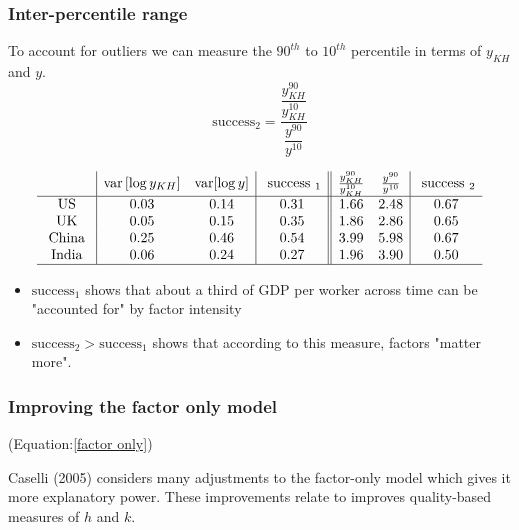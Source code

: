 \documentclass[11pt]{article}
\begin{document}
\subsubsection{Inter-percentile range}

To account for outliers we can measure the $90^{th}$ to $10^{th}$ percentile in terms of $y_{KH}$ and $y$.
\begin{equation}
    \label{success2}
    \text{success}_2 = \dfrac{\dfrac{y_{KH}^{90}}{y_{KH}^{10}}}{\dfrac{y^{90}}{y^{10}}}
\end{equation}

\begin{equation}
\begin{array}{c|cc|c||cc|c} 
& \operatorname{var}\left[\log y_{K H}\right] & \operatorname{var}[\log y] & \text { success }_1 & \frac{y_{K H}^{90}}{y_{K H}^{10}} & \frac{y^{90}}{y^{10}} & \text { success }_2 \\
\hline \text { US } & 0.03 & 0.14 & 0.31 & 1.66 & 2.48 & 0.67 \\
\text { UK } & 0.05 & 0.15 & 0.35 & 1.86 & 2.86 & 0.65 \\
\text { China } & 0.25 & 0.46 & 0.54 & 3.99 & 5.98 & 0.67 \\
\text { India } & 0.06 & 0.24 & 0.27 & 1.96 & 3.90 & 0.50 \\
\hline
\end{array}
\end{equation}

\begin{itemize}
    \item $\text{success}_1$ shows that about a third of GDP per worker across time can be "accounted for" by factor intensity
    \item$\text{success}_2 > \text{success}_1$ shows that according to this measure, factors "matter more".
\end{itemize}

\subsubsection{Improving the factor only model}

(Equation:\eqref{factor only})

Caselli (2005) considers many adjustments to the factor-only model which gives it more explanatory power. These improvements relate to improves quality-based measures of $h$ and $k$.
        
\end{document}
